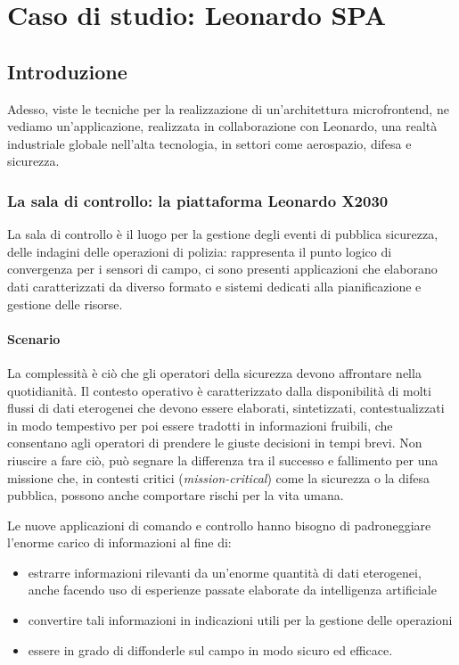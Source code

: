 \chapter{Caso di studio: Leonardo SPA}\label{ch:leonardo}

\section{Introduzione}

Adesso, viste le tecniche per la realizzazione di un'architettura microfrontend, ne vediamo
un'applicazione, realizzata in collaborazione con Leonardo, una realtà industriale globale 
nell'alta tecnologia, in settori come aerospazio, difesa e sicurezza.

\subsection{La sala di controllo: la piattaforma Leonardo X2030}
La sala di controllo è il luogo per la gestione degli eventi di pubblica sicurezza, delle indagini
delle operazioni di polizia: rappresenta il punto logico di convergenza per i sensori di campo,
ci sono presenti applicazioni che elaborano dati caratterizzati da diverso formato 
e sistemi dedicati alla pianificazione e gestione delle risorse.
 
\subsubsection{Scenario}
La complessità è ciò che gli operatori della sicurezza devono affrontare nella quotidianità.
Il contesto operativo è caratterizzato dalla disponibilità di
molti flussi di dati eterogenei che devono essere elaborati,
sintetizzati, contestualizzati in modo tempestivo per poi essere
tradotti in informazioni fruibili, che consentano agli operatori di
prendere le giuste decisioni in tempi brevi.
Non riuscire a fare ciò, può segnare la differenza tra il successo
e fallimento per una missione che, in contesti critici (\emph{mission-critical}) come
la sicurezza o la difesa pubblica, possono anche comportare rischi per la vita umana.

Le nuove applicazioni di comando e controllo hanno bisogno di padroneggiare l'enorme carico di informazioni
al fine di:
\begin{itemize}
    \item estrarre informazioni rilevanti da un'enorme quantità di
    dati eterogenei, anche facendo uso di esperienze passate elaborate da intelligenza artificiale
    \item convertire tali informazioni in indicazioni utili per la gestione delle operazioni
    \item essere in grado di diffonderle sul campo in modo sicuro ed efficace.
\end{itemize}

